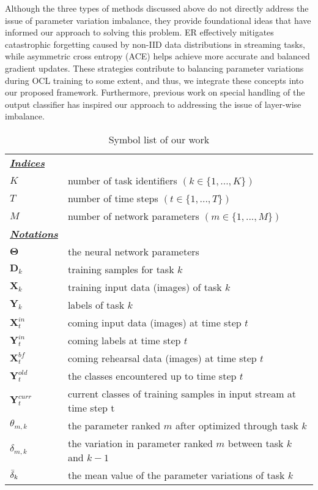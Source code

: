 Although the three types of methods discussed above do not directly address the issue of parameter variation imbalance, they provide foundational ideas that have informed our approach to solving this problem. ER effectively mitigates catastrophic forgetting caused by non-IID data distributions in streaming tasks, while asymmetric cross entropy (ACE) helps achieve more accurate and balanced gradient updates. These strategies contribute to balancing parameter variations during OCL training to some extent, and thus, we integrate these concepts into our proposed framework. Furthermore, previous work on special handling of the output classifier has inspired our approach to addressing the issue of layer-wise imbalance.
\iffalse
\begin{table*}[htbp]
    \label{tab:labels}
	\caption{Symbol list of our work}
    \centering
	\begin{tabularx}{\textwidth}{p{}X}
		\toprule	
		\underline{\textbf{\emph{Indices}}} \\
		$K$ & number of task identifiers $(k \in \{1,...,K\})$  \\ 
		$T$ & number of time steps $(t \in \{1,...,T\})$ \\
        $M$ & number of network parameters $(m \in \{1,...,M\})$ \\
		\underline{\textbf{\emph{Notations}}} \\  
		$\boldsymbol{\Theta}$  & the neural network parameters \\
		$\mathbf{D}_{k}$      & training samples for task $k$ \\
		$\mathbf{X}_{k}$    & training input data (images) of task $k$  \\
        $\mathbf{Y}_{k}$    & labels of task $k$  \\
		$\mathbf{X}^{in}_t$     & coming input data (images) at time step $t$\\
        $\mathbf{Y}^{in}_t$     & coming labels at time step $t$\\
        $\mathbf{X}^{bf}_t$     & coming rehearsal data (images) at time step $t$\\
        $\mathbf{Y}^{old}_t$ & the classes encountered up to time step $t$ \\
        $\mathbf{Y}^{curr}_t $ & current classes of training samples in input stream at time step t\\
        $\theta_{m,k}$     & the parameter ranked $m$ after optimized through task $k$   \\
		$\delta_{m,k}$     & the variation in parameter ranked $m$ between task \( k \) and \( k-1 \)\\
        $\Bar{\delta}_{k}$ & the mean value of the parameter variations of task $k$ \\


\end{tabularx}
\end{table*}

